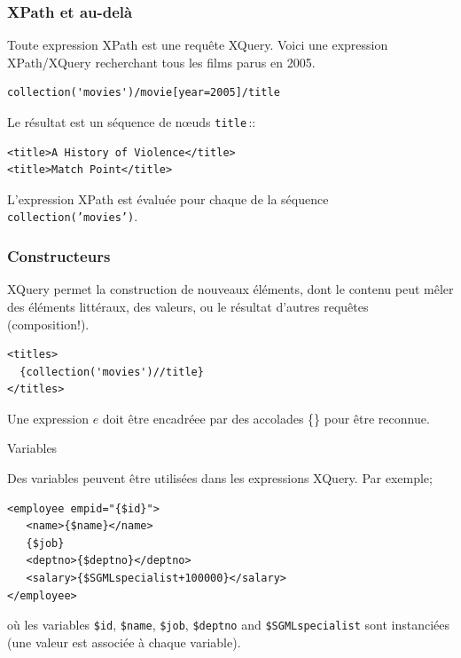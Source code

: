 \begin{frame}[fragile]
\frametitle{XPath et au-delà}

Toute expression XPath est une requête XQuery. Voici une expression XPath/XQuery
recherchant tous les films parus en 2005.

\begin{lstlisting}[language=myXQuery]
collection('movies')/movie[year=2005]/title
\end{lstlisting}

Le résultat est un \alert{séquence} de nœuds \texttt{title}\,::
\begin{lstlisting}[language=myXML]
<title>A History of Violence</title>
<title>Match Point</title>
\end{lstlisting}

\begin{remark}
L'expression XPath est évaluée pour chaque  de la séquence  \texttt{collection('movies')}.
\end{remark}

\end{frame}


\begin{frame}[fragile]
\frametitle{Constructeurs}

XQuery permet la construction de nouveaux éléments, dont le contenu
peut mêler des éléments littéraux, des valeurs, ou le résultat d'autres requêtes
(composition!).

\begin{lstlisting}[language=myXQuery]
<titles>
  {collection('movies')//title}
</titles>
\end{lstlisting}
 

\begin{remark}
Une expression $e$ doit être encadréee par des accolades
\{\} pour être reconnue. 
\end{remark}
\end{frame}

\begin{frame}[containsverbatim]{Variables}

Des variables peuvent être utilisées dans les expressions XQuery. Par exemple;

\begin{lstlisting}
<employee empid="{$id}">
   <name>{$name}</name>
   {$job} 
   <deptno>{$deptno}</deptno> 
   <salary>{$SGMLspecialist+100000}</salary>
</employee>
\end{lstlisting}

où les variables \lstinline!$id!, \lstinline!$name!, \lstinline!$job!, \lstinline!$deptno! and \lstinline!$SGMLspecialist! sont instanciées (une valeur est associée à chaque variable). 

\end{frame}


